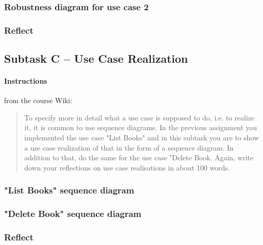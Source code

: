 \subsubsection{Robustness diagram for use case 2}\label{task-1b-robust2}
%


\subsubsection{Reflect}\label{task-1b-reflect}
%



\subsection{Subtask C -- Use Case Realization}\label{task-1c}
\paragraph{Instructions}\label{task-1c-instructions}
from the course Wiki\cite{1dv600:lab2:instructions}:

\begin{quote}
  To specify more in detail what a use case is supposed to do, i.e. to realize
  it, it is common to use sequence diagrams. In the previous assignment you
  implemented the use case "List Books" and in this subtask you are to show a
  use case realization of that in the form of a sequence diagram. In addition
  to that, do the same for the use case "Delete Book.  Again, write down your
  reflections on use case realisations in about 100 words.
\end{quote}


\subsubsection{"List Books" sequence diagram}\label{task-1c-sequence1}
%


\subsubsection{"Delete Book" sequence diagram}\label{task-1c-sequence2}
%


\subsubsection{Reflect}\label{task-1c-reflect}
%

